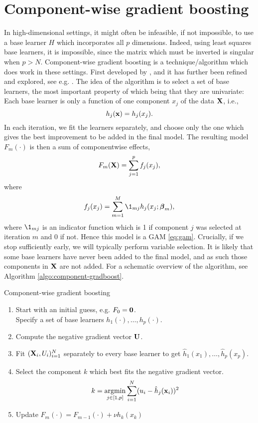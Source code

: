 \section{Component-wise gradient boosting}
In high-dimensional settings, it might often be infeasible, if not impossible, to use a base learner $H$ which incorporates all $p$ dimensions. Indeed, using least squares base learners, it is impossible, since the matrix which must be inverted is singular when $p>N$. Component-wise gradient boosting is a technique/algorithm which does work in these settings. First developed by \cite{buhlmann-yu}, and it has further been refined and explored, see e.g. \cite{buhlmann2006}. The idea of the algorithm is to select a set of base learners, the most important property of which being that they are univariate: Each base learner is only a function of one component $x_j$ of the data $\mathbf{X}$, i.e.,
\begin{equation*}
    h_j(\mathbf{x})=h_j(x_j).
\end{equation*}
In each iteration, we fit the learners separately, and choose only the one which gives the best improvement to be added in the final model. The resulting model $F_m(\cdot)$ is then a sum of componentwise effects,
\begin{equation*}
    F_m(\mathbf{X})=\sum_{j=1}^pf_j(x_j),
\end{equation*}
where
\begin{equation*}
    f_j(x_j)=\sum_{m=1}^M\1_{mj}h_j(x_j;\bbeta_m),
\end{equation*}
where $\1_{mj}$ is an indicator function which is 1 if component $j$ was selected at iteration $m$ and 0 if not.
Hence this model is a GAM \eqref{eq:gam}. Crucially, if we stop sufficiently early, we will typically perform variable selection. It is likely that some base learners have never been added to the final model, and as such those components in $\mathbf{X}$ are not added. For a schematic overview of the algorithm, see Algorithm \ref{algo:component-gradboost}.
\begin{algorithm}
\caption{Component-wise gradient boosting}
\label{algo:component-gradboost}
\begin{enumerate}
    \item Start with an initial guess, e.g. $F_0=\mathbf{0}$.\\
    Specify a set of base learners $h_1(\cdot),\dotsc,h_p(\cdot)$.
    \item Compute the negative gradient vector $\mathbf{U}$.
    \item Fit $(\mathbf{X}_i,U_i)_{i=1}^N$ separately to every base learner to get $\hat{h}_1(x_1),\dotsc,\hat{h}_p(x_p)$.
    \item Select the component $k$ which best fits the negative gradient vector.
        \begin{equation*}
            k=\operatorname*{argmin}_{j\in[1,p]}\sum_{i=1}^N(u_i-\hat{h}_j(\mathbf{x}_i))^2
        \end{equation*}
    \item Update $F_m(\cdot)=F_{m-1}(\cdot)+\nu h_k(x_k)$
\end{enumerate}
\end{algorithm}
